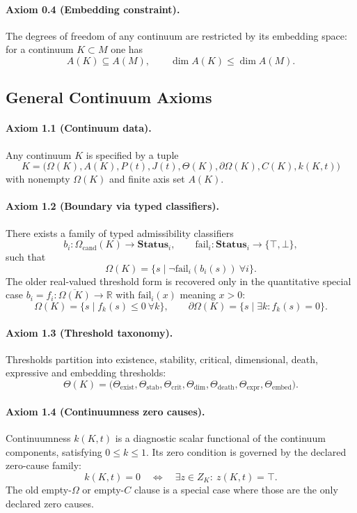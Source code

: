 \paragraph{Axiom 0.4 (Embedding constraint).}
The degrees of freedom of any continuum are restricted by its embedding space:
for a continuum \(K\subset M\) one has
\[
  A(K) \subseteq A(M),
  \qquad
  \dim A(K) \le \dim A(M).
\]

\subsection{General Continuum Axioms}

\paragraph{Axiom 1.1 (Continuum data).}
Any continuum \(K\) is specified by a tuple
\[
  K =
  \big(
    \Omega(K), A(K), P(t), J(t),
    \Theta(K), \partial\Omega(K), C(K), k(K,t)
  \big)
\]
with nonempty \(\Omega(K)\) and finite axis set \(A(K)\).

\paragraph{Axiom 1.2 (Boundary via typed classifiers).}
There exists a family of typed admissibility classifiers
\[
  b_i:\Omega_{\mathrm{cand}}(K)\to\mathbf{Status}_i,
  \qquad
  \mathrm{fail}_i:\mathbf{Status}_i\to\{\top,\bot\},
\]
such that
\[
  \Omega(K)=\{s\mid \neg\mathrm{fail}_i(b_i(s))\ \forall i\}.
\]
The older real-valued threshold form is recovered only in the quantitative
special case \(b_i=f_i:\overline{\Omega(K)}\to\mathbb{R}\) with
\(\mathrm{fail}_i(x)\) meaning \(x>0\):
\[
  \Omega(K) = \big\{ s \mid f_k(s)\le 0 \ \forall k \big\},
  \qquad
  \partial\Omega(K) = \big\{ s \mid \exists k: f_k(s)=0 \big\}.
\]

\paragraph{Axiom 1.3 (Threshold taxonomy).}
Thresholds partition into existence, stability, critical, dimensional, death,
expressive and embedding thresholds:
\[
  \Theta(K) =
  \big(
    \Theta_{\mathrm{exist}},
    \Theta_{\mathrm{stab}},
    \Theta_{\mathrm{crit}},
    \Theta_{\mathrm{dim}},
    \Theta_{\mathrm{death}},
    \Theta_{\mathrm{expr}},
    \Theta_{\mathrm{embed}}
  \big).
\]

\paragraph{Axiom 1.4 (Continuumness zero causes).}
Continuumness \(k(K,t)\) is a diagnostic scalar functional of the continuum
components, satisfying \(0\le k\le 1\). Its zero condition is governed by the
declared zero-cause family:
\[
  k(K,t)=0
  \quad\Longleftrightarrow\quad
  \exists z\in Z_K:\ z(K,t)=\top.
\]
The old empty-\(\Omega\) or empty-\(C\) clause is a special case where those
are the only declared zero causes.

